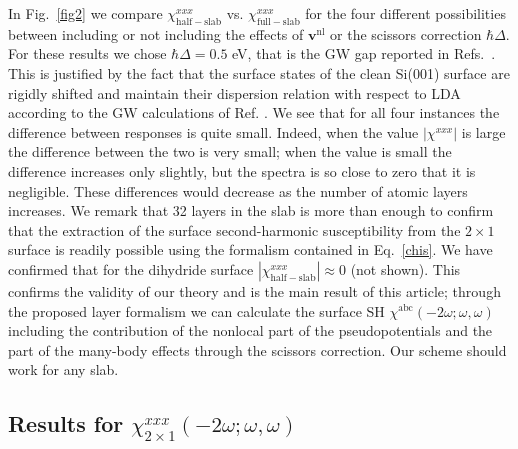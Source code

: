 \documentclass[floatfix,prb,aps,superscriptaddress,showpacs,11pt,preprint,letterpaper]{revtex4}
\def\chon{red}
\begin{document}
In Fig.~\ref{fig2}
we compare 
$\chi^{xxx}_{\mathrm{half-slab}}$  
vs. 
$\chi^{xxx}_{\mathrm{full-slab}}$ 
for the four different possibilities 
between including or not including the
effects of $\mathbf{v}^\mathrm{nl}$ or the scissors correction
$\hbar\Delta$.   
For these results we chose
$\hbar\Delta=0.5$ eV, that is the GW gap reported in
Refs.~. 
{\color{\chon}This is justified by the fact that the surface states of the clean 
Si(001) surface are 
rigidly shifted and maintain their
dispersion relation with 
respect to LDA according to
 the GW calculations of Ref.
. 
}
We see that for all four instances the 
difference between responses is quite small.
Indeed, when the value $|\chi^{xxx}|$ 
is large the difference between the two is very small; 
when the value is small the difference increases only slightly, 
but the spectra is so close to zero that it is negligible. 
These differences would decrease as the number of atomic layers 
increases. We remark that 32 layers in the slab is more than enough 
to confirm that the extraction of the surface second-harmonic 
susceptibility from the $2\times 1$ surface is readily possible 
using the formalism contained in Eq.~\eqref{chis}.
We have confirmed that for the dihydride surface
$|\chi^{xxx}_{\mathrm{half-slab}}|\approx 0$ (not shown).
This confirms the validity of our theory and is the main result of
this article; through the proposed layer formalism we can calculate the surface SH
$\chi^{\mathrm{a}\mathrm{b}\mathrm{c}}(-2\omega;\omega,\omega)$    
including
the
contribution of the nonlocal part of the pseudopotentials 
and the part of the many-body effects through the scissors correction.
Our scheme should work for any slab.

\subsection{\texorpdfstring{Results for $\chi^{xxx}_{2\times 1}(-2\omega;\omega,\omega)$}
{Results for Xxxx(2x1)(-2w;w,w)}}
\end{document}
